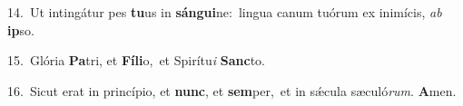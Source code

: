 {\numbfont\textcolor{\numbcolor}{14.}}~Ut intingátur pes \textbf{tu}\-us in \textbf{sán}\-\textbf{gui}ne:~\star lingua canum tuórum ex inimícis, \textit{ab} \textbf{ip}\-so.\par
{\numbfont\textcolor{\numbcolor}{15.}}~Glória \textbf{Pa}\-tri, et \textbf{Fí}\-\textbf{li}o,~\star et Spirítu\textit{i} \textbf{Sanc}\-to.\par
{\numbfont\textcolor{\numbcolor}{16.}}~Sicut erat in princípio, et \textbf{nunc}\-, et \textbf{sem}\-per,~\star et in sǽcula sæculó\-\textit{rum}\-. \textbf{A}\-men.\par
